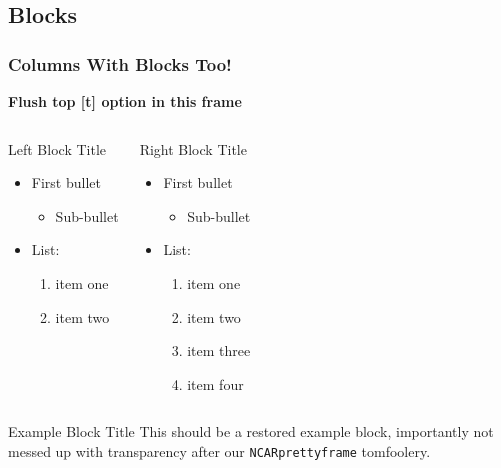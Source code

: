 \documentclass[aspectratio=1610]{beamer}
\begin{document}
\subsection{Blocks}
\begin{frame}[t]
  \frametitle{Columns With Blocks Too!}

  \textbf{Flush top [t] option in this frame}

  \begin{columns}[t]
    \begin{block}{Left Block Title}
    \begin{itemize}
    \item First bullet
      \begin{itemize}
      \item Sub-bullet
      \end{itemize}
    \item List:
      \begin{enumerate}
      \item item one
      \item item two
      \end{enumerate}
    \end{itemize}
    \end{block}
    \begin{block}{Right Block Title}
    \begin{itemize}
    \item First bullet
      \begin{itemize}
      \item Sub-bullet
      \end{itemize}
    \item List:
      \begin{enumerate}
      \item item one
      \item item two
      \item item three
      \item item four
      \end{enumerate}
    \end{itemize}
    \end{block}
  \end{columns}

  \begin{exampleblock}{Example Block Title}
    This should be a restored example block, importantly not messed up with transparency after our \texttt{NCARprettyframe} tomfoolery.
  \end{exampleblock}
\end{frame}
\end{document}
